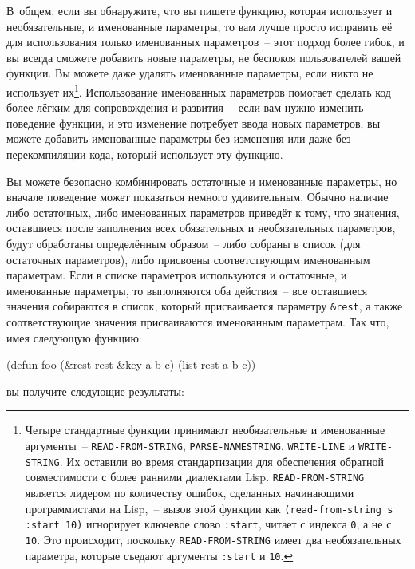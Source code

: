 В~общем, если вы обнаружите, что вы пишете функцию, которая использует и необязательные, и
именованные параметры, то вам лучше просто исправить её для использования только
именованных параметров~-- этот подход более гибок, и вы всегда сможете добавить новые
параметры, не беспокоя пользователей вашей функции.  Вы можете даже удалять именованные
параметры, если никто не использует их\footnote{Четыре стандартные функции принимают
  необязательные и именованные аргументы~-- \lstinline{READ-FROM-STRING},
  \lstinline{PARSE-NAMESTRING}, \lstinline{WRITE-LINE} и \lstinline{WRITE-STRING}.  Их оставили во время
  стандартизации для обеспечения обратной совместимости с более ранними диалектами Lisp.
  \lstinline{READ-FROM-STRING} является лидером по количеству ошибок, сделанных начинающими
  программистами на Lisp,~-- вызов этой функции как \lstinline{(read-from-string s :start 10)}
  игнорирует ключевое слово \lstinline{:start}, читает с индекса \lstinline{0}, а не с \lstinline{10}.
  Это происходит, поскольку \lstinline{READ-FROM-STRING} имеет два необязательных параметра,
  которые съедают аргументы \lstinline{:start} и \lstinline{10}.}\hspace{\footnotenegspace}.  Использование именованных
параметров помогает сделать код более лёгким для сопровождения и развития~-- если вам
нужно изменить поведение функции, и это изменение потребует ввода новых параметров, вы
можете добавить именованные параметры без изменения или даже без перекомпиляции кода,
который использует эту функцию.

Вы можете безопасно комбинировать остаточные и именованные параметры, но вначале поведение
может показаться немного удивительным.  Обычно наличие либо остаточных, либо именованных
параметров приведёт к тому, что значения, оставшиеся после заполнения всех обязательных и
необязательных параметров, будут обработаны определённым образом~-- либо собраны в список
(для остаточных параметров), либо присвоены соответствующим именованным параметрам. Если в
списке параметров используются и остаточные, и именованные параметры, то выполняются оба
действия~-- все оставшиеся значения собираются в список, который присваивается параметру
\lstinline!&rest!, а также соответствующие значения присваиваются именованным параметрам.
Так что, имея следующую функцию:

\begin{myverb}
(defun foo (&rest rest &key a b c) 
  (list rest a b c))
\end{myverb}

\noindent{}вы получите следующие результаты:

